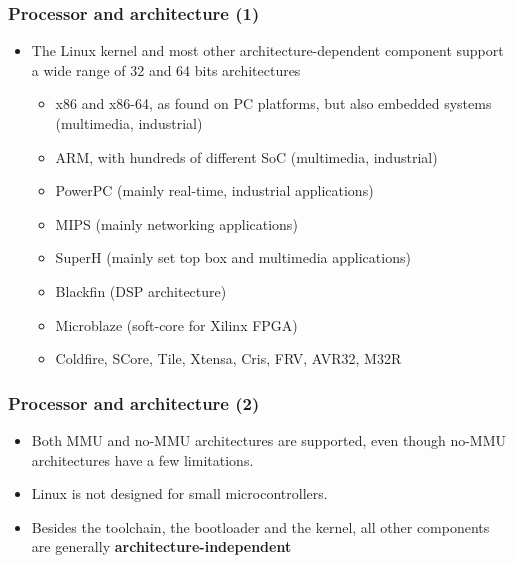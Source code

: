\begin{frame}
  \frametitle{Processor and architecture (1)}
  \begin{itemize}
  \item The Linux kernel and most other architecture-dependent component support a
    wide range of 32 and 64 bits architectures
    \begin{itemize}
    \item x86 and x86-64, as found on PC platforms, but also embedded systems
      (multimedia, industrial)
    \item ARM, with hundreds of different SoC (multimedia, industrial)
    \item PowerPC (mainly real-time, industrial applications)
    \item MIPS (mainly networking applications)
    \item SuperH (mainly set top box and multimedia applications)
    \item Blackfin (DSP architecture)
    \item Microblaze (soft-core for Xilinx FPGA)
    \item Coldfire, SCore, Tile, Xtensa, Cris, FRV, AVR32, M32R
    \end{itemize}
  \end{itemize}
\end{frame}

\begin{frame}
  \frametitle{Processor and architecture (2)}
  \begin{itemize}
  \item Both MMU and no-MMU architectures are supported, even though
    no-MMU architectures have a few limitations.
  \item Linux is not designed for small microcontrollers.
  \item Besides the toolchain, the bootloader and the kernel, all
    other components are generally {\bf architecture-independent}
  \end{itemize}
\end{frame}

